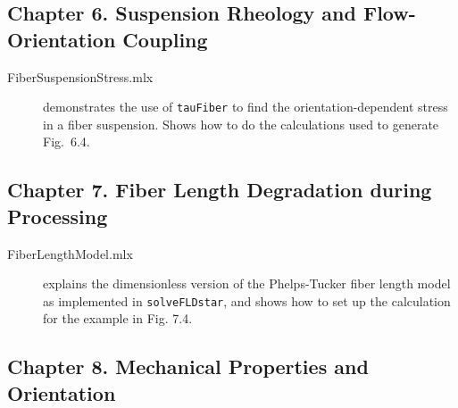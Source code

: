 \documentclass[11pt]{article}
\begin{document}
\subsection*{Chapter 6. Suspension Rheology and Flow-Orientation Coupling}

\begin{description}

    \item[FiberSuspensionStress.mlx]{demonstrates the use of \texttt{tauFiber} to find the orientation-dependent stress in a fiber suspension.  Shows how to do the calculations used to generate Fig.~6.4.}
    
\end{description}

\subsection*{Chapter 7. Fiber Length Degradation during Processing}

\begin{description}

    \item[FiberLengthModel.mlx]{explains the dimensionless version of the Phelps-Tucker fiber length model as implemented in \texttt{solveFLDstar}, and shows how to set up the calculation for the example in Fig. 7.4.}

\end{description}

\subsection*{Chapter 8. Mechanical Properties and Orientation}
\end{document}
